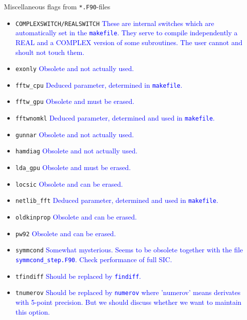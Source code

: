 \documentclass[11pt]{article}
\newcommand{\PGR}[1]{\textcolor{blue}{#1}}
\begin{document}
			Miscellaneous flags from \texttt{*.F90}-files
			\begin{itemize}
				\item \texttt{COMPLEXSWITCH/REALSWITCH}
                                   \PGR{These are internal switches
                                     which are automatically set in
                                     the {\tt makefile}. They serve to
                                   compile independently a REAL and a
                                   COMPLEX version of some
                                   subroutines. The user cannot and
                                   shoult not touch them.}
				\item \texttt{exonly}
                                   \PGR{Obsolete and not actually used.}
				\item \texttt{fftw\_cpu}
                                   \PGR{Deduced parameter, determined
                                     in {\tt makefile}.}
				\item \texttt{fftw\_gpu}
                                   \PGR{Obsolete and must be erased.}
				\item \texttt{fftwnomkl}
                                   \PGR{Deduced parameter, determined
                                     and used in {\tt makefile}.}
				\item \texttt{gunnar}
                                   \PGR{Obsolete and not actually used.}
				\item \texttt{hamdiag}
                                   \PGR{Obsolete and not actually used.}
				\item \texttt{lda\_gpu}
                                   \PGR{Obsolete and must be erased.}
				\item \texttt{locsic}
                                   \PGR{Obsolete and can be erased.}
				\item \texttt{netlib\_fft}
                                   \PGR{Deduced parameter, determined
                                     and used in {\tt makefile}.}
				\item \texttt{oldkinprop}
                                   \PGR{Obsolete and can be erased.}
				\item \texttt{pw92}
                                   \PGR{Obsolete and can be erased.}
				\item \texttt{symmcond}
                                   \PGR{Somewhat mysterious. Seems to
                                     be obsolete together with the
                                     file {\tt symmcond\_step.F90}. Check
                                   performance of full SIC.}
				\item \texttt{tfindiff}
                                    \PGR{Should be replaced by {\tt findiff}.}
				\item \texttt{tnumerov} \PGR{Should be
                                  replaced by {\tt numerov} where
                                  'numerov' means derivates with
                                  5-point precision. But we should
                                  discuss whether we want to maintain
                                  this option.  }
			\end{itemize}
			
			



	
\end{document}
